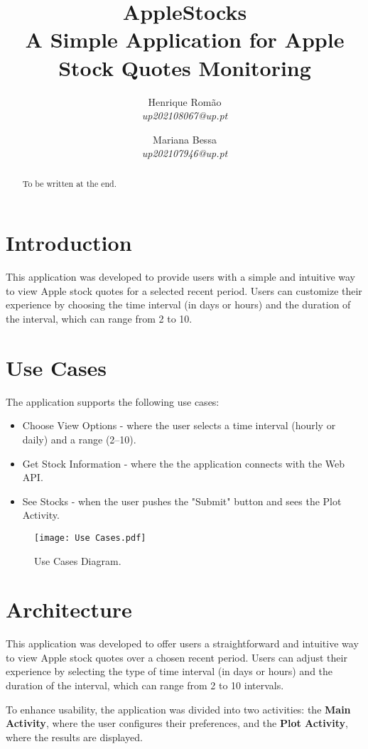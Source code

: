 \documentclass{article}
\title{\Huge \textbf{AppleStocks}\\\vspace{0.2em} \Large A Simple Application for Apple Stock Quotes Monitoring}
\author{
    Henrique Romão \\ 
    \textit{up202108067@up.pt} 
    \and 
    Mariana Bessa \\ 
    \textit{up202107946@up.pt}
}
\begin{document}
\maketitle

\begin{abstract}
    To be written at the end.
\end{abstract}

\section{Introduction}
This application was developed to provide users with a simple and intuitive way to view Apple stock quotes for a selected recent period. 
Users can customize their experience by choosing the time interval (in days or hours) and the duration of the interval, which can range from 2 to 10.

\section{Use Cases}
The application supports the following use cases:
\begin{itemize}
    \item Choose View Options - where the user selects a time interval (hourly or daily) and a range (2–10).
    \item Get Stock Information - where the the application connects with the Web API.
    \item See Stocks - when the user pushes the "Submit" button and sees the Plot Activity.
\end{itemize}

\begin{figure}[h!]
    \centering
    \texttt{[image: Use Cases.pdf]}
    \caption{Use Cases Diagram.}
    \label{fig:UseCases}
\end{figure}

\section{Architecture}
This application was developed to offer users a straightforward and intuitive way to view Apple stock quotes over a chosen recent period. Users can adjust their experience by selecting the type of time interval (in days or hours) and the duration of the interval, which can range from 2 to 10 intervals.

To enhance usability, the application was divided into two activities: the \textbf{Main Activity}, where the user configures their preferences, and the \textbf{Plot Activity}, where the results are displayed.
\end{document}
